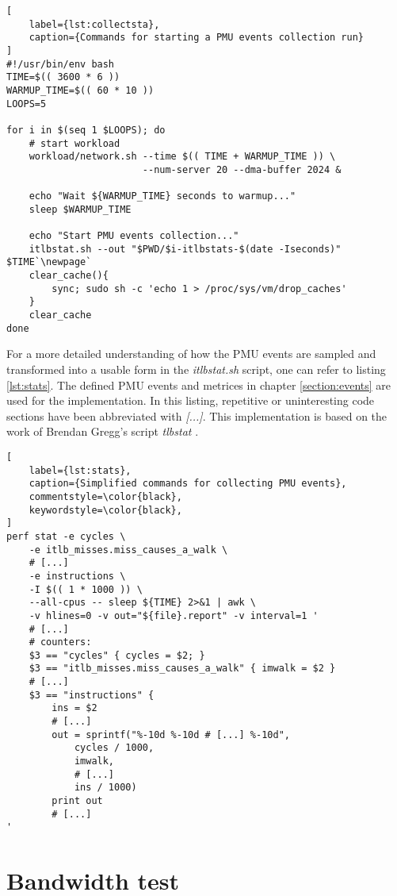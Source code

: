 \vspace{.5\baselineskip}
\begin{lstlisting}[
    label={lst:collectsta},
    caption={Commands for starting a PMU events collection run}
]
#!/usr/bin/env bash
TIME=$(( 3600 * 6 ))
WARMUP_TIME=$(( 60 * 10 ))
LOOPS=5

for i in $(seq 1 $LOOPS); do
    # start workload
    workload/network.sh --time $(( TIME + WARMUP_TIME )) \
                        --num-server 20 --dma-buffer 2024 &
    
    echo "Wait ${WARMUP_TIME} seconds to warmup..."
    sleep $WARMUP_TIME
    
    echo "Start PMU events collection..."
    itlbstat.sh --out "$PWD/$i-itlbstats-$(date -Iseconds)" $TIME`\newpage`
    clear_cache(){
        sync; sudo sh -c 'echo 1 > /proc/sys/vm/drop_caches'
    }
    clear_cache
done
\end{lstlisting}

For a more detailed understanding of how the PMU events are sampled and transformed into a usable form in the \textit{itlbstat.sh} script, one can refer to listing \ref{lst:stats}. The defined PMU events and metrices in chapter \ref{section:events} are used for the implementation. In this listing, repetitive or uninteresting code sections have been abbreviated with \textit{[...]}. This implementation is based on the work of Brendan Gregg's script \textit{tlbstat} \cite{tlbstat}.

\vspace{.5\baselineskip}
\begin{lstlisting}[
    label={lst:stats},
    caption={Simplified commands for collecting PMU events},
    commentstyle=\color{black},
    keywordstyle=\color{black},
]
perf stat -e cycles \
    -e itlb_misses.miss_causes_a_walk \
    # [...]
    -e instructions \
    -I $(( 1 * 1000 )) \
    --all-cpus -- sleep ${TIME} 2>&1 | awk \
    -v hlines=0 -v out="${file}.report" -v interval=1 '
    # [...]
    # counters:
    $3 == "cycles" { cycles = $2; }
    $3 == "itlb_misses.miss_causes_a_walk" { imwalk = $2 }
    # [...]
    $3 == "instructions" {
        ins = $2
        # [...]
        out = sprintf("%-10d %-10d # [...] %-10d",
            cycles / 1000,
            imwalk,
            # [...]
            ins / 1000)
        print out
        # [...]
'
\end{lstlisting}

\newpage

\section{Bandwidth test}\label{appendix:bandwidth}

